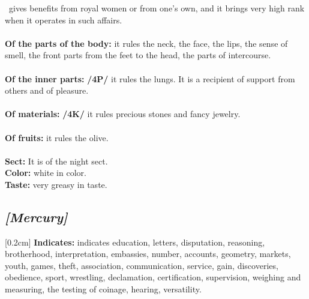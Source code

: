 \Venus\, gives benefits from royal women or from one’s own, and it brings very high rank when it operates in such affairs. \\
\\
\textbf{Of the parts of the body:} it rules the neck, the face, the lips, the sense of smell, the front parts from the feet to the head, the parts of intercourse. \\
\\
\textbf{Of the inner parts:} \textbf{/4P/} it rules the lungs. It is a recipient of support from others and of pleasure.\\ 
\\
\textbf{Of materials:} \textbf{/4K/} it rules precious stones and fancy jewelry. \\
\\ 
\textbf{Of fruits:} it rules the olive. \\
\\
\textbf{Sect:} It is of the night sect.\\
\textbf{Color:} white in color. \\
\textbf{Taste:} very greasy in taste.

\secbr
\subsection{\textit{[Mercury]}}
[0.2cm]
\noindent
\textbf{Indicates:} \Mercury{} indicates education, letters, disputation, reasoning, brotherhood, interpretation, embassies, number, accounts, geometry, markets, youth, games, theft, association, communication, service, gain, discoveries, obedience, sport, wrestling, declamation, certification, supervision, weighing and measuring, the testing of coinage, hearing, versatility. 

